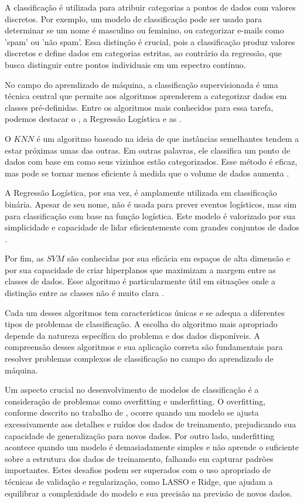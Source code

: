 A classificação é utilizada para atribuir categorias a pontos de dados com valores discretos. Por exemplo, um modelo de classificação pode ser usado para determinar se um nome é masculino ou feminino, ou categorizar e-mails como 'spam' ou 'não spam'. Essa distinção é crucial, pois a classificação produz valores discretos e define dados em categorias estritas, ao contrário da regressão, que busca distinguir entre pontos individuais em um espectro contínuo.

No campo do aprendizado de máquina, a classificação supervisionada é uma técnica central que permite aos algoritmos aprenderem a categorizar dados em classes pré-definidas. Entre os algoritmos mais conhecidos para essa tarefa, podemos destacar o , a Regressão Logística e as .

O $KNN$ é um algoritmo baseado na ideia de que instâncias semelhantes tendem a estar próximas umas das outras. Em outras palavras, ele classifica um ponto de dados com base em como seus vizinhos estão categorizados. Esse método é eficaz, mas pode se tornar menos eficiente à medida que o volume de dados aumenta \cite{2011_Samworth}.

A Regressão Logística, por sua vez, é amplamente utilizada em classificação binária. Apesar de seu nome, não é usada para prever eventos logísticos, mas sim para classificação com base na função logística. Este modelo é valorizado por sua simplicidade e capacidade de lidar eficientemente com grandes conjuntos de dados \cite{2010_Yu}.

Por fim, as $SVM$ são conhecidas por sua eficácia em espaços de alta dimensão e por sua capacidade de criar hiperplanos que maximizam a margem entre as classes de dados. Esse algoritmo é particularmente útil em situações onde a distinção entre as classes não é muito clara \cite{2004_Smola}.

Cada um desses algoritmos tem características únicas e se adequa a diferentes tipos de problemas de classificação. A escolha do algoritmo mais apropriado depende da natureza específica do problema e dos dados disponíveis. A compreensão desses algoritmos e sua aplicação correta são fundamentais para resolver problemas complexos de classificação no campo do aprendizado de máquina.

Um aspecto crucial no desenvolvimento de modelos de classificação é a consideração de problemas como overfitting e underfitting. O overfitting, conforme descrito no trabalho de , ocorre quando um modelo se ajusta excessivamente aos detalhes e ruídos dos dados de treinamento, prejudicando sua capacidade de generalização para novos dados. Por outro lado, underfitting acontece quando um modelo é demasiadamente simples e não aprende o suficiente sobre a estrutura dos dados de treinamento, falhando em capturar padrões importantes. Estes desafios podem ser superados com o uso apropriado de técnicas de validação e regularização, como LASSO e Ridge, que ajudam a equilibrar a complexidade do modelo e sua precisão na previsão de novos dados.

